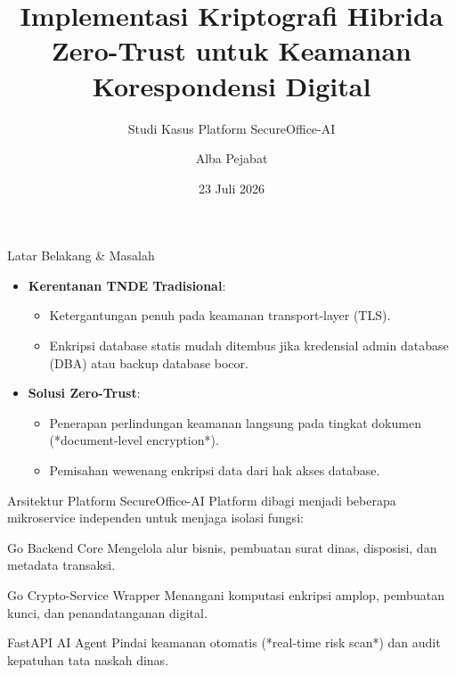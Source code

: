 \documentclass{beamer}
\title[Kriptografi Hibrida Zero-Trust]{Implementasi Kriptografi Hibrida Zero-Trust untuk Keamanan Korespondensi Digital}
\subtitle{Studi Kasus Platform SecureOffice-AI}
\author{Alba Pejabat}
\institute{Departemen Keamanan Informasi}
\date{23 Juli 2026}
\begin{document}
\begin{frame}
  \titlepage
\end{frame}

\begin{frame}{Latar Belakang \& Masalah}
  \begin{itemize}
    \item \textbf{Kerentanan TNDE Tradisional}:
      \begin{itemize}
        \item Ketergantungan penuh pada keamanan transport-layer (TLS).
        \item Enkripsi database statis mudah ditembus jika kredensial admin database (DBA) atau backup database bocor.
      \end{itemize}
    \vspace{0.3cm}
    \item \textbf{Solusi Zero-Trust}:
      \begin{itemize}
        \item Penerapan perlindungan keamanan langsung pada tingkat dokumen (*document-level encryption*).
        \item Pemisahan wewenang enkripsi data dari hak akses database.
      \end{itemize}
  \end{itemize}
\end{frame}

\begin{frame}{Arsitektur Platform SecureOffice-AI}
  Platform dibagi menjadi beberapa mikroservice independen untuk menjaga isolasi fungsi:
  \vspace{0.2cm}
  \begin{block}{Go Backend Core}
    Mengelola alur bisnis, pembuatan surat dinas, disposisi, dan metadata transaksi.
  \end{block}
  \begin{block}{Go Crypto-Service Wrapper}
    Menangani komputasi enkripsi amplop, pembuatan kunci, dan penandatanganan digital.
  \end{block}
  \begin{block}{FastAPI AI Agent}
    Pindai keamanan otomatis (*real-time risk scan*) dan audit kepatuhan tata naskah dinas.
  \end{block}
\end{frame}
\end{document}
